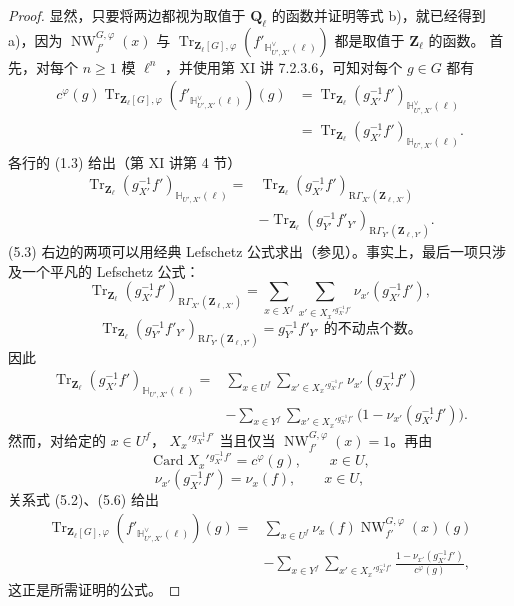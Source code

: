\begin{proof}
显然，只要将两边都视为取值于 $\mathbf Q_\ell$ 的函数并证明等式 b)，就已经得到 a)，因为
$\operatorname{NW}_{f'}^{G,\varphi}(x)$ 与
$\operatorname{Tr}_{\mathbf Z_\ell[G],\varphi}(f'_{\mathbb H_{U',X'}^\vee(\ell)})$
都是取值于 $\mathbf Z_\ell$ 的函数。
首先，对每个 $n\geq1$ 模 $\ell^n$ ，并使用第 XI 讲 7.2.3.6，可知对每个 $g\in G$ 都有
\[
\begin{aligned}
c^\varphi(g)\operatorname{Tr}_{\mathbf Z_\ell[G],\varphi}
 (f'_{\mathbb H_{U',X'}^\vee(\ell)})(g)
 &=\operatorname{Tr}_{\mathbf Z_\ell}
   (g_{X'}^{-1}f')_{\mathbb H_{U',X'}^\vee(\ell)}\\
 &=\operatorname{Tr}_{\mathbf Z_\ell}
   (g_{X'}^{-1}f')_{\mathbb H_{U',X'}(\ell)}.
\end{aligned}
\tag{5.2}
\]
各行的 (1.3) 给出（第 XI 讲第 4 节）
\[
\begin{aligned}
\operatorname{Tr}_{\mathbf Z_\ell}
 (g_{X'}^{-1}f')_{\mathbb H_{U',X'}(\ell)}
={}&\operatorname{Tr}_{\mathbf Z_\ell}
 (g_{X'}^{-1}f')_{\mathrm R\Gamma_{X'}(\mathbf Z_{\ell,X'})}\\
&-\operatorname{Tr}_{\mathbf Z_\ell}
 (g_{Y'}^{-1}f'_{Y'})_{\mathrm R\Gamma_{Y'}(\mathbf Z_{\ell,Y'})}.
\end{aligned}
\tag{5.3}
\]
(5.3) 右边的两项可以用经典 Lefschetz 公式求出（参见）。事实上，最后一项只涉及一个平凡的 Lefschetz 公式：
\[
\operatorname{Tr}_{\mathbf Z_\ell}
 (g_{X'}^{-1}f')_{\mathrm R\Gamma_{X'}(\mathbf Z_{\ell,X'})}
=\sum_{x\in X^f}\sum_{x'\in X_x'{}^{g_{X'}^{-1}f'}}
 \nu_{x'}(g_{X'}^{-1}f'),
\tag{5.4}
\]
\[
\operatorname{Tr}_{\mathbf Z_\ell}
 (g_{Y'}^{-1}f'_{Y'})_{\mathrm R\Gamma_{Y'}(\mathbf Z_{\ell,Y'})}
=\text{$g_{Y'}^{-1}f'_{Y'}$ 的不动点个数。}
\tag{5.5}
\]
因此
\[
\begin{aligned}
\operatorname{Tr}_{\mathbf Z_\ell}
 (g_{X'}^{-1}f')_{\mathbb H_{U',X'}(\ell)}
={}&\sum_{x\in U^f}\sum_{x'\in X_x'{}^{g_{X'}^{-1}f'}}
 \nu_{x'}(g_{X'}^{-1}f')\\
&-\sum_{x\in Y^f}\sum_{x'\in X_x'{}^{g_{X'}^{-1}f'}}
 \bigl(1-\nu_{x'}(g_{X'}^{-1}f')\bigr).
\end{aligned}
\tag{5.6}
\]
然而，对给定的 $x\in U^f$， $X_x'{}^{g_{X'}^{-1}f'}$ 当且仅当
$\operatorname{NW}_{f'}^{G,\varphi}(x)=1$。再由
\[
\operatorname{Card}X_x'{}^{g_{X'}^{-1}f'}=c^\varphi(g),\qquad x\in U,
\tag{5.7}
\]
\[
\nu_{x'}(g_{X'}^{-1}f')=\nu_x(f),\qquad x\in U,
\tag{5.8}
\]
关系式 (5.2)、(5.6) 给出
\[
\begin{aligned}
\operatorname{Tr}_{\mathbf Z_\ell[G],\varphi}
 (f'_{\mathbb H_{U',X'}^\vee(\ell)})(g)
={}&\sum_{x\in U^f}\nu_x(f)\operatorname{NW}_{f'}^{G,\varphi}(x)(g)\\
&-\sum_{x\in Y^f}\sum_{x'\in X_x'{}^{g_{X'}^{-1}f'}}
 \frac{1-\nu_{x'}(g_{X'}^{-1}f')}{c^\varphi(g)},
\end{aligned}
\tag{5.9}
\]
这正是所需证明的公式。
\end{proof}

